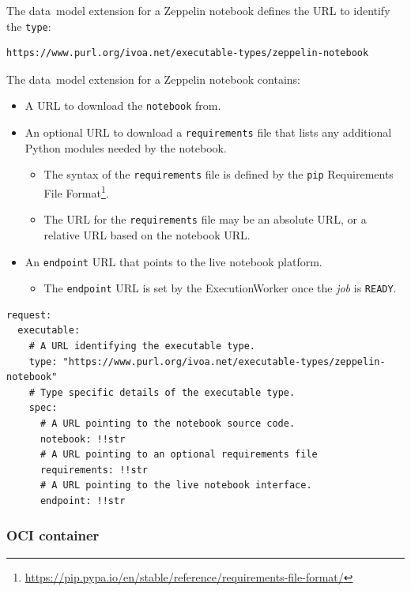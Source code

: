 \documentclass[11pt,a4paper]{ivoa}
\newcommand{\datamodel} {data~model}
\newcommand{\execworkerclass} {ExecutionWorker}
\newcommand{\python} {Python}
\newcommand{\zeppelin} {Zeppelin}
\newcommand{\codeword}[1] {\texttt{#1}}
\newcommand{\footurl}[1] {\footnote{\url{#1}}}
\newcommand{\job} {\textit{job}}
\begin{document}
The \datamodel{} extension for a \zeppelin{} notebook defines the URL
to identify the \codeword{type}:
\begin{lstlisting}[]
https://www.purl.org/ivoa.net/executable-types/zeppelin-notebook
\end{lstlisting}
\hfill \break
The \datamodel{} extension for a \zeppelin{} notebook contains:
\begin{itemize}
    \item A URL to download the \codeword{notebook} from.
    \item An optional URL to download a \codeword{requirements} file that lists any additional
    \python{} modules needed by the notebook.
    \begin{itemize}
        \item The syntax of the \codeword{requirements} file is defined by the \codeword{pip}
        Requirements File Format\footurl{https://pip.pypa.io/en/stable/reference/requirements-file-format/}.
        \item The URL for the \codeword{requirements} file may be an absolute URL, or a relative URL based on the notebook URL.
    \end{itemize}
    \item An \codeword{endpoint} URL that points to the live notebook platform.
    \begin{itemize}
        \item The \codeword{endpoint} URL is set by the \execworkerclass{} once the \job{} is \codeword{READY}.
    \end{itemize}
\end{itemize}

\begin{lstlisting}[]
request:
  executable:
    # A URL identifying the executable type.
    type: "https://www.purl.org/ivoa.net/executable-types/zeppelin-notebook"
    # Type specific details of the executable type.
    spec:
      # A URL pointing to the notebook source code.
      notebook: !!str
      # A URL pointing to an optional requirements file
      requirements: !!str
      # A URL pointing to the live notebook interface.
      endpoint: !!str
\end{lstlisting}

\subsubsection{OCI container}
\label{datamodel-oci-container}
\end{document}
